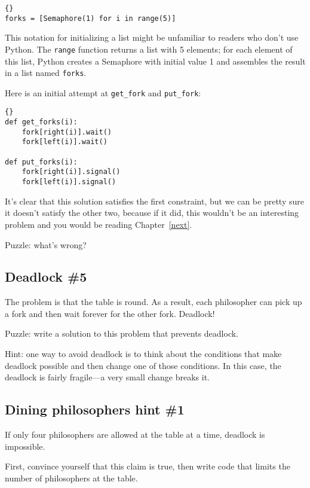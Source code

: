 \documentclass{book}
\newcommand{\clearemptydoublepage}{\newpage\cleardoublepage}
\begin{document}
\begin{lstlisting}[title={Variables for dining philosophers}]{}
forks = [Semaphore(1) for i in range(5)]
\end{lstlisting}

This notation for initializing a list might be unfamiliar to
readers who don't use Python.  The {\tt range} function returns
a list with 5 elements; for each element of this list, Python
creates a Semaphore with initial value 1 and assembles the
result in a list named {\tt forks}.

Here is an initial attempt at {\tt get\_fork} and {\tt put\_fork}:

\begin{lstlisting}[title={Dining philosophers non-solution}]{}
def get_forks(i):
    fork[right(i)].wait()
    fork[left(i)].wait()

def put_forks(i):
    fork[right(i)].signal()
    fork[left(i)].signal()
\end{lstlisting}

It's clear that this solution satisfies the first constraint, but
we can be pretty sure it doesn't satisfy the other two, because
if it did, this wouldn't be an interesting problem and you would
be reading Chapter~\ref{next}.

Puzzle: what's wrong?


\clearemptydoublepage
\subsection{Deadlock \#5}

The problem is that the table is round.  As a result, each philosopher
can pick up a fork and then wait forever for the other fork.  Deadlock!

Puzzle: write a solution to this problem that prevents deadlock.

Hint: one way to avoid deadlock is to think about the conditions
that make deadlock possible and then change one of those conditions.
In this case, the deadlock is fairly fragile---a very small change
breaks it.

\clearemptydoublepage
\subsection{Dining philosophers hint \#1}

If only four philosophers are allowed at the table at a time,
deadlock is impossible.

First, convince yourself that this claim is true, then write code that
limits the number of philosophers at the table.
\end{document}
